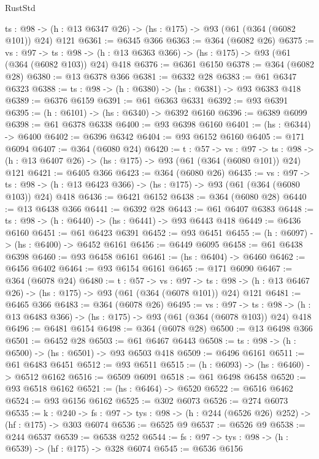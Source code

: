 \begin{lexlean}{RustStd}
\begin{coremodule}
  {ts : @98} -> (h : @13 @6347 @26) -> (hs : @175) -> @93 (@61 (@364 (@6082 @101)) @24) @121
@6361 := @6345 @366
@6363 := @364 (@6082 @26)
@6375 := {vs : @97} ->
  {ts : @98} -> (h : @13 @6363 @366) -> (hs : @175) -> @93 (@61 (@364 (@6082 @103)) @24) @418
@6376 := @6361 @6150
@6378 := @364 (@6082 @28)
@6380 := @13 @6378 @366
@6381 := @6332 @28
@6383 := @61 @6347 @6323
@6388 := {ts : @98} -> (h : @6380) -> (hs : @6381) -> @93 @6383 @418
@6389 := @6376 @6159
@6391 := @61 @6363 @6331
@6392 := @93 @6391
@6395 := (h : @6101) -> (hs : @6340) -> @6392 @6160
@6396 := @6389 @6099
@6398 := @61 @6378 @6338
@6400 := @93 @6398 @6160
@6401 := (hs : @6344) -> @6400
@6402 := @6396 @6342
@6404 := @93 @6152 @6160
@6405 := @171 @6094
@6407 := @364 (@6080 @24)
@6420 := {t : @57} ->
  {vs : @97} ->
  {ts : @98} -> (h : @13 @6407 @26) -> (hs : @175) -> @93 (@61 (@364 (@6080 @101)) @24) @121
@6421 := @6405 @366
@6423 := @364 (@6080 @26)
@6435 := {vs : @97} ->
  {ts : @98} -> (h : @13 @6423 @366) -> (hs : @175) -> @93 (@61 (@364 (@6080 @103)) @24) @418
@6436 := @6421 @6152
@6438 := @364 (@6080 @28)
@6440 := @13 @6438 @366
@6441 := @6392 @28
@6443 := @61 @6407 @6383
@6448 := {ts : @98} -> (h : @6440) -> (hs : @6441) -> @93 @6443 @418
@6449 := @6436 @6160
@6451 := @61 @6423 @6391
@6452 := @93 @6451
@6455 := (h : @6097) -> (hs : @6400) -> @6452 @6161
@6456 := @6449 @6095
@6458 := @61 @6438 @6398
@6460 := @93 @6458 @6161
@6461 := (hs : @6404) -> @6460
@6462 := @6456 @6402
@6464 := @93 @6154 @6161
@6465 := @171 @6090
@6467 := @364 (@6078 @24)
@6480 := {t : @57} ->
  {vs : @97} ->
  {ts : @98} -> (h : @13 @6467 @26) -> (hs : @175) -> @93 (@61 (@364 (@6078 @101)) @24) @121
@6481 := @6465 @366
@6483 := @364 (@6078 @26)
@6495 := {vs : @97} ->
  {ts : @98} -> (h : @13 @6483 @366) -> (hs : @175) -> @93 (@61 (@364 (@6078 @103)) @24) @418
@6496 := @6481 @6154
@6498 := @364 (@6078 @28)
@6500 := @13 @6498 @366
@6501 := @6452 @28
@6503 := @61 @6467 @6443
@6508 := {ts : @98} -> (h : @6500) -> (hs : @6501) -> @93 @6503 @418
@6509 := @6496 @6161
@6511 := @61 @6483 @6451
@6512 := @93 @6511
@6515 := (h : @6093) -> (hs : @6460) -> @6512 @6162
@6516 := @6509 @6091
@6518 := @61 @6498 @6458
@6520 := @93 @6518 @6162
@6521 := (hs : @6464) -> @6520
@6522 := @6516 @6462
@6524 := @93 @6156 @6162
@6525 := @302 @6073
@6526 := @274 @6073
@6535 := {k : @240} ->
  {fs : @97} -> {tys : @98} -> (h : @244 (@6526 @26) @252) -> (hf : @175) -> @303 @6074
@6536 := @6525 @9
@6537 := @6526 @9
@6538 := @244 @6537
@6539 := @6538 @252
@6544 := {fs : @97} -> {tys : @98} -> (h : @6539) -> (hf : @175) -> @328 @6074
@6545 := @6536 @6156

\end{coremodule}
\end{lexlean}
